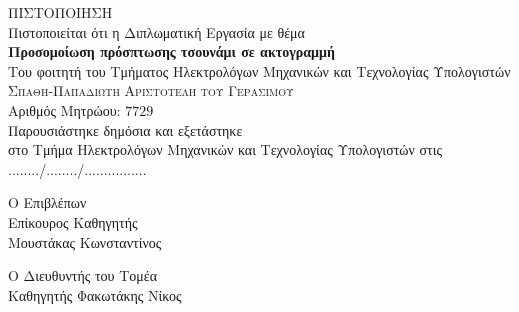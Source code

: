 \large
\begin{center}
  {\huge \textsc{ΠΙΣΤΟΠΟΙΗΣΗ}}\\[1cm]
  Πιστοποιείται ότι η Διπλωματική Εργασία με θέμα\\[0.5cm]
  \textbf{\Large Προσομοίωση πρόσπτωσης τσουνάμι σε ακτογραμμή}\\[1cm]
  Του φοιτητή του Τμήματος Ηλεκτρολόγων Μηχανικών και Τεχνολογίας Υπολογιστών\\[0.5cm]
  \textsc{\Large Σπαθη-Παπαδιωτη Αριστοτελη του Γερασιμου}\\[10pt]
  Αριθμός Μητρώου: $7729$\\[2cm]
  Παρουσιάστηκε δημόσια και εξετάστηκε\\στο Τμήμα Ηλεκτρολόγων Μηχανικών και
  Τεχνολογίας Υπολογιστών στις\\[0.5cm]
  ......../......../................\\
\end{center}

\vfill
\begin{minipage}[t]{0.5\textwidth}
  \begin{flushleft}
    Ο Επιβλέπων\\
    Επίκουρος Καθηγητής\\
    Μουστάκας Κωνσταντίνος
  \end{flushleft}
\end{minipage}
\begin{minipage}[t]{0.5\textwidth}
  \begin{flushright}
    Ο Διευθυντής του Τομέα\\
    Καθηγητής Φακωτάκης Νίκος
  \end{flushright}
\end{minipage}
\thispagestyle{empty}
\normalsize
\newpage

